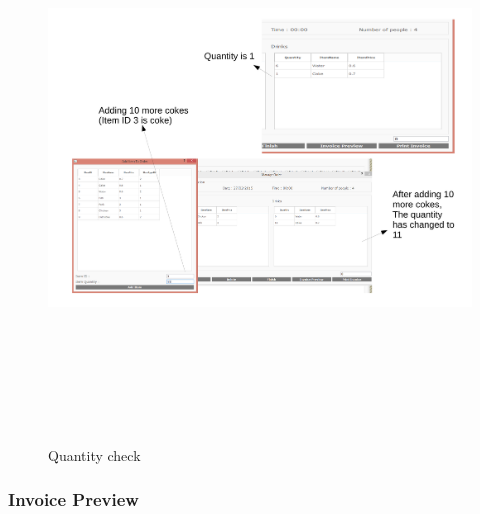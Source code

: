 \begin{landscape}
\begin{figure}[H]
    \includegraphics[height = 15cm]{./Testing/images/Test6.pdf}
    \caption{Quantity check} \label{fig:Test6}
\end{figure}

\subsubsection{Invoice Preview}


\end{landscape}
